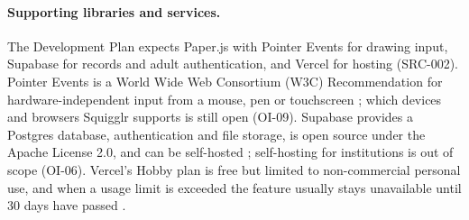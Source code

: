 \documentclass[12pt]{article}
\renewcommand{\_}{\textunderscore\allowbreak}%
\begin{document}
\paragraph{Supporting libraries and services.}
The Development Plan expects Paper.js with Pointer Events for drawing input,
Supabase for records and adult authentication, and Vercel for hosting (SRC-002).
Pointer Events is a World Wide Web Consortium (W3C) Recommendation for
hardware-independent input from a mouse, pen or touchscreen
\citep{W3C2026PointerEvents}; which devices and browsers Squigglr supports is
still open (OI-09). Supabase provides a Postgres database, authentication and
file storage, is open source under the Apache License 2.0, and can be
self-hosted \citep{Supabase2026GitHub}; self-hosting for institutions is out of
scope (OI-06). Vercel's Hobby
plan is free but limited to non-commercial personal use, and when a usage limit
is exceeded the feature usually stays unavailable until 30 days have passed
\citep{Vercel2026Hobby}.
\end{document}
